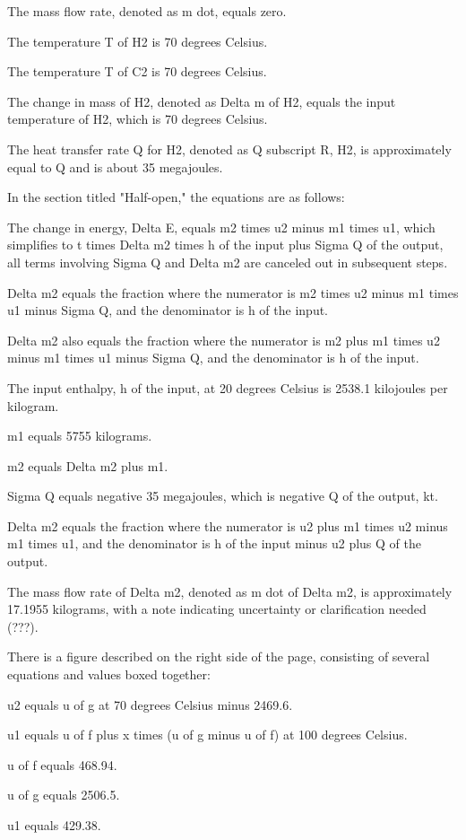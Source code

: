 The mass flow rate, denoted as m dot, equals zero.

The temperature T of H2 is 70 degrees Celsius.

The temperature T of C2 is 70 degrees Celsius.

The change in mass of H2, denoted as Delta m of H2, equals the input temperature of H2, which is 70 degrees Celsius.

The heat transfer rate Q for H2, denoted as Q subscript R, H2, is approximately equal to Q and is about 35 megajoules.

In the section titled "Half-open," the equations are as follows:

The change in energy, Delta E, equals m2 times u2 minus m1 times u1, which simplifies to t times Delta m2 times h of the input plus Sigma Q of the output, all terms involving Sigma Q and Delta m2 are canceled out in subsequent steps.

Delta m2 equals the fraction where the numerator is m2 times u2 minus m1 times u1 minus Sigma Q, and the denominator is h of the input.

Delta m2 also equals the fraction where the numerator is m2 plus m1 times u2 minus m1 times u1 minus Sigma Q, and the denominator is h of the input.

The input enthalpy, h of the input, at 20 degrees Celsius is 2538.1 kilojoules per kilogram.

m1 equals 5755 kilograms.

m2 equals Delta m2 plus m1.

Sigma Q equals negative 35 megajoules, which is negative Q of the output, kt.

Delta m2 equals the fraction where the numerator is u2 plus m1 times u2 minus m1 times u1, and the denominator is h of the input minus u2 plus Q of the output.

The mass flow rate of Delta m2, denoted as m dot of Delta m2, is approximately 17.1955 kilograms, with a note indicating uncertainty or clarification needed (???).

There is a figure described on the right side of the page, consisting of several equations and values boxed together:

u2 equals u of g at 70 degrees Celsius minus 2469.6.

u1 equals u of f plus x times (u of g minus u of f) at 100 degrees Celsius.

u of f equals 468.94.

u of g equals 2506.5.

u1 equals 429.38.